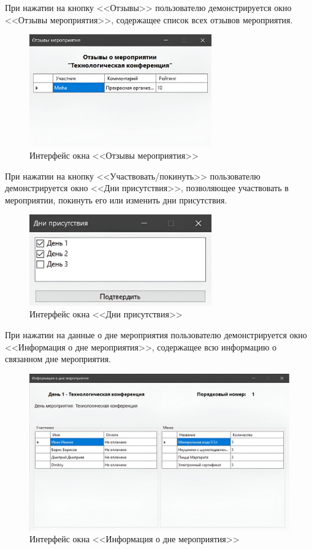 При нажатии на кнопку <<Отзывы>> пользователю демонстрируется окно <<Отзывы мероприятия>>, содержащее список всех отзывов мероприятия.
\begin{figure}[h!]
	\centering
	\includegraphics[width=0.7\textwidth]{images/app-event-feedbacks.png}
	\caption{Интерфейс окна <<Отзывы мероприятия>>} 
	\label{fig:app-event-feedbacks} 
\end{figure}

\newpage

При нажатии на кнопку <<Участвовать/покинуть>> пользователю демонстрируется окно <<Дни присутствия>>, позволяющее участвовать в мероприятии, покинуть его или изменить дни присутствия.

\begin{figure}[h!]
	\centering
	\includegraphics[width=0.7\textwidth]{images/app-event-participation.png}
	\caption{Интерфейс окна <<Дни присутствия>>} 
	\label{fig:app-event-participation} 
\end{figure}

При нажатии на данные о дне мероприятия пользователю демонстрируется окно <<Информация о дне мероприятия>>, содержащее всю информацию о связанном дне мероприятия.
\begin{figure}[h!]
	\centering
	\includegraphics[width=1\textwidth]{images/app-day-info.png}
	\caption{Интерфейс окна <<Информация о дне мероприятия>>} 
	\label{fig:app-day-info} 
\end{figure}

